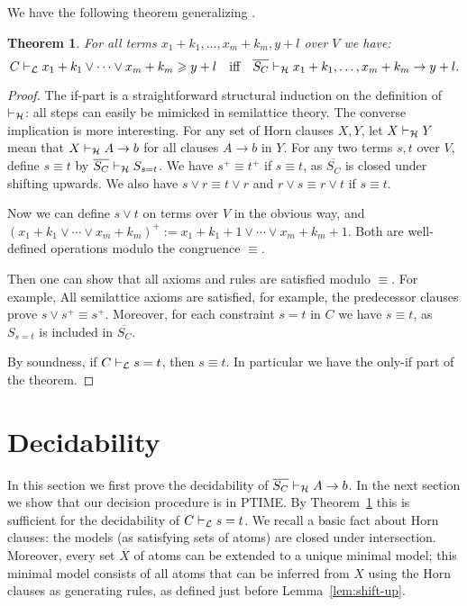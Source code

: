 \documentclass[11pt,a4paper]{article}
\newtheorem{theorem}{Theorem}[section]
\newcommand\jterm[3]{{{#1_1}+{#2_1}}\vee\cdots\vee{{#1_#3}+{#2_#3}}}
\newcommand\jbody[3]{{{#1_1}+{#2_1}},\ldots,{{#1_#3}+{#2_#3}}}
\newcommand\lathy{{\cal L}}
\newcommand\prvL{\vdash_{\lathy}}
\newcommand\prvH{\vdash_{\cal H}}
\newcommand\upS[1]{\overline{S_{#1}}}
\newcommand{\FYI}[1]{{\color{red}#1}}
\begin{document}
We have the following theorem generalizing \cite[Theorem 3]{Lorenzen51}.

\begin{theorem}\label{thm:LvsH}
For all terms $\jbody{x}{k}{m},y+l$ over $V$ we have:
\[
C\prvL \jterm{x}{k}{m}\geqslant y+l 
\quad\text{iff}\quad
\upS{C}\prvH \jbody{x}{k}{m}\to y+l.
\]
\end{theorem} 
\begin{proof}
The if-part is a straightforward \FYI{structural induction on the definition} of $\prvH$:
all steps can easily be mimicked in semilattice theory.
The converse implication is more interesting.
For any set of Horn clauses $X,Y$, let $X \prvH Y$ mean
that $X \prvH A\to b$ for all clauses $A\to b$ in $Y$.
For any two terms $s,t$ over $V$, define $s\equiv t$ by
$\upS{C} \prvH S_{s=t}$. \FYI{We have $s^+\equiv t^+$ 
if $s\equiv t$, as $\upS{C}$ is closed under shifting upwards.
We also have $s\vee r \equiv t\vee r$ and
$r\vee s \equiv r\vee t$ if $s\equiv t$.}

Now we can define $s\vee t$ on terms over $V$ in the obvious way,
and $(\jterm{x}{k}{m})^+ := x_1+k_1+1 \vee\cdots\vee x_m+k_m+1$.
\FYI{Both are well-defined operations modulo the congruence $\equiv$.}

Then one can show that all axioms and rules are satisfied modulo $\equiv$. 
For example, 
All semilattice axioms are satisfied, for example,
the predecessor clauses prove $s\vee s^+ \equiv s^+$. 
Moreover, for each constraint $s=t$ in $C$ 
we have $s\equiv t$, as $S_{s=t}$ is included in $\upS{C}$.

By soundness, if $C\prvL s=t$, then $s\equiv t$.
In particular we have the only-if part of the theorem.
\end{proof}

\section{Decidability}\label{sec:decidability}

In this section we first prove the decidability of $\upS{C}\prvH A\to b$.
In the next section we show that our decision procedure is in PTIME. 
By Theorem~\ref{thm:LvsH} this is sufficient for
the decidability of $C\prvL s=t$. We recall a basic fact
about Horn clauses: the models (as satisfying sets of atoms)
are closed under intersection. Moreover, every set $X$ of atoms
can be extended to a unique minimal model; this minimal model
consists of all atoms that can be inferred from $X$ using the
Horn clauses as generating rules, as defined just before Lemma~\ref{lem:shift-up}. 
\end{document}
